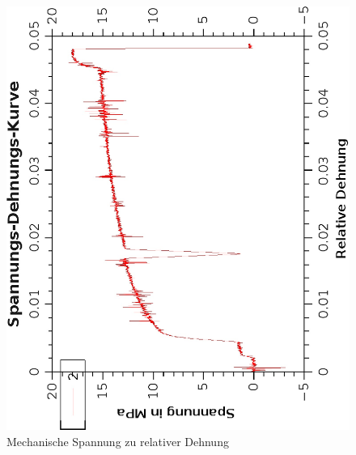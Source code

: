 \documentclass{article}
\begin{document}
\begin{center}
\begin{figure}[H]	
\caption{Mechanische Spannung zu relativer Dehnung}
\includegraphics[scale=0.8,angle=-90]{spannungsdehnungskurve.eps}
\end{figure}
\end{center}
\end{document}
